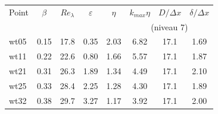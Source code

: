 \begin{tabular}{lccccccc}
\hline
Point & $\beta$ & $Re_\lambda$ & $\varepsilon$ & $\eta$ & $k_{max}\eta$ & $D/\Delta x$ & $\delta/\Delta x$ \\
\multicolumn{5}{l}{} & \multicolumn{3}{c}{(niveau 7)} \\
\hline
wt05 & 0.15 & 17.8 & 0.35 & 2.03 & 6.82 & 17.1 & 1.69 \\
wt11 & 0.22 & 22.6 & 0.80 & 1.66 & 5.57 & 17.1 & 1.87 \\
wt21 & 0.31 & 26.3 & 1.89 & 1.34 & 4.49 & 17.1 & 2.10 \\
wt25 & 0.33 & 28.4 & 2.25 & 1.28 & 4.30 & 17.1 & 1.89 \\
wt32 & 0.38 & 29.7 & 3.27 & 1.17 & 3.92 & 17.1 & 2.00 \\
\hline
\end{tabular}
